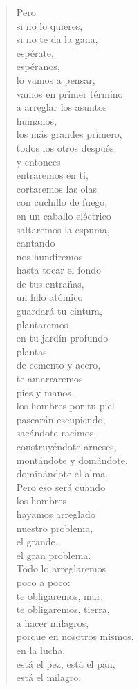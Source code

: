 \documentclass[12pt]{article}
\begin{document}
\begin{verse}
Pero\\
si no lo quieres,\\
si no te da la gana,\\
espérate,\\
espéranos,\\
lo vamos a pensar,\\
vamos en primer término\\
a arreglar los asuntos\\
humanos,\\
los más grandes primero,\\
todos los otros después,\\
y entonces\\
entraremos en ti,\\
cortaremos las olas\\
con cuchillo de fuego,\\
en un caballo eléctrico\\
saltaremos la espuma,\\
cantando\\
nos hundiremos\\
hasta tocar el fondo\\
de tus entrañas,\\
un hilo atómico\\
guardará tu cintura,\\
plantaremos\\
en tu jardín profundo\\
plantas\\
de cemento y acero,\\
te amarraremos\\
pies y manos,\\
los hombres por tu piel\\
pasearán escupiendo,\\
sacándote racimos,\\
construyéndote arneses,\\
montándote y domándote,\\
dominándote el alma.\\
Pero eso será cuando\\
los hombres\\
hayamos arreglado\\
nuestro problema,\\
el grande,\\
el gran problema.\\
Todo lo arreglaremos\\
poco a poco:\\
te obligaremos, mar,\\
te obligaremos, tierra,\\
a hacer milagros,\\
porque en nosotros mismos,\\
en la lucha,\\
está el pez, está el pan,\\
está el milagro.  

\end{verse}
\end{document}
